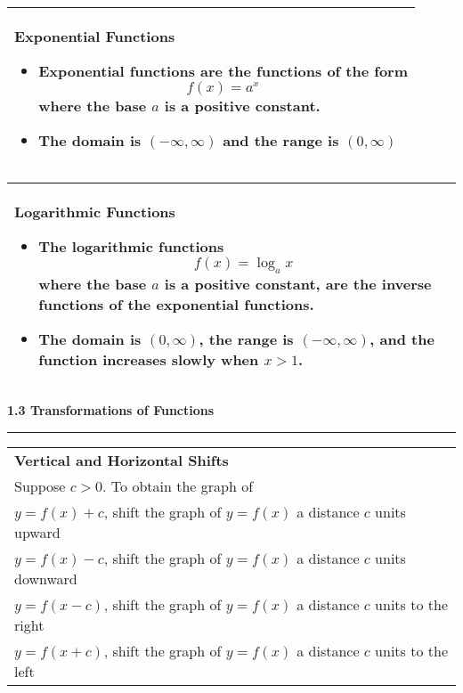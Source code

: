 \documentclass[fleqn]{article}
\begin{document}
\begin{center}
\def\arraystretch{1.3}
{\setlength{\tabcolsep}{16pt}
\begin{tabularx}{.9\textwidth}{|X|}
\hline
	\vspace{1pt}
	\textbf{Exponential Functions}
	\begin{itemize}
	\item \textbf{Exponential functions} are the functions of the form 
	$$f(x) = a^x$$
	where the base $a$ is a positive constant.
	\item The domain is $(-\infty, \infty)$ and the range is $(0,\infty)$
	\end{itemize} \\
\hline
\end{tabularx}}
\vspace{12pt}

\def\arraystretch{1.3}
{\setlength{\tabcolsep}{16pt}
\begin{tabularx}{.9\textwidth}{|X|}
\hline
	\vspace{1pt}
	\textbf{Logarithmic Functions}
	\begin{itemize}
	\item The \textbf{logarithmic functions}
	$$f(x) = \log_a x$$
	where the base $a$ is a positive constant, are the inverse functions of the exponential functions. 
	\item The domain is $(0, \infty)$, the range is $(-\infty, \infty)$, and the function increases slowly when $x > 1$.
	\end{itemize} \\
\hline
\end{tabularx}}
\vspace{64pt}

\Large\textbf{1.3 Transformations of Functions}

\noindent\hfill\rule{0.3\textwidth}{.4pt}\hfill
\vspace{12pt}

\large

\def\arraystretch{1.3}
{\setlength{\tabcolsep}{16pt}
\begin{tabularx}{.9\textwidth}{|X|}
\hline
	\vspace{1pt}
	\textbf{Vertical and Horizontal Shifts} \\[6pt]
	\hspace{12pt} Suppose $c>0$. To obtain the graph of \\[6pt]
	\hspace{12pt} $y = f(x) + c$, shift the graph of $y = f(x)$ a distance $c$ units upward \\[3pt]
	\hspace{12pt} $y = f(x) - c$, shift the graph of $y = f(x)$ a distance $c$ units downward \\[3pt]
	\hspace{12pt} $y = f(x-c)$, shift the graph of $y = f(x)$ a distance $c$ units to the right \\[3pt]
	\hspace{12pt} $y = f(x+c)$, shift the graph of $y = f(x)$ a distance $c$ units to the left \\[12pt]	
\hline
\end{tabularx}}
\vspace{12pt}


\end{center}
\end{document}
